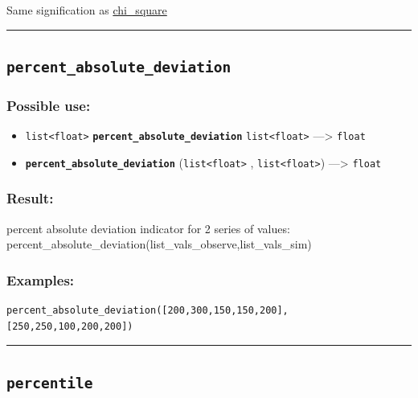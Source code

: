 \documentclass[]{book}
\providecommand{\tightlist}{%
  \setlength{\itemsep}{0pt}\setlength{\parskip}{0pt}}
\theoremstyle{definition}
\theoremstyle{definition}
\theoremstyle{definition}
\theoremstyle{remark}
\begin{document}
Same signification as
\href{operators-b-to-c.html\#chi_square}{chi\_square}

\begin{center}\rule{0.5\linewidth}{\linethickness}\end{center}

\subsection{\texorpdfstring{\texttt{percent\_absolute\_deviation}}{percent\_absolute\_deviation}}\label{percent_absolute_deviation}

\subsubsection{Possible use:}\label{possible-use-398}

\begin{itemize}
\tightlist
\item
  \texttt{list\textless{}float\textgreater{}}
  \textbf{\texttt{percent\_absolute\_deviation}}
  \texttt{list\textless{}float\textgreater{}} ---\textgreater{}
  \texttt{float}
\item
  \textbf{\texttt{percent\_absolute\_deviation}}
  (\texttt{list\textless{}float\textgreater{}} ,
  \texttt{list\textless{}float\textgreater{}}) ---\textgreater{}
  \texttt{float}
\end{itemize}

\subsubsection{Result:}\label{result-384}

percent absolute deviation indicator for 2 series of values:
percent\_absolute\_deviation(list\_vals\_observe,list\_vals\_sim)

\subsubsection{Examples:}\label{examples-274}

\begin{verbatim}
percent_absolute_deviation([200,300,150,150,200],[250,250,100,200,200]) 
\end{verbatim}

\begin{center}\rule{0.5\linewidth}{\linethickness}\end{center}

\subsection{\texorpdfstring{\texttt{percentile}}{percentile}}\label{percentile}
\end{document}
